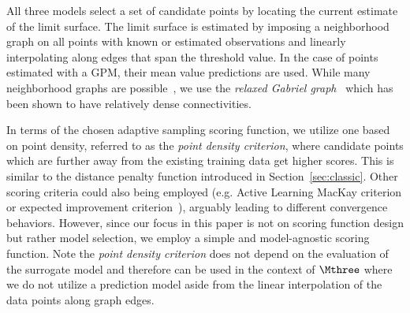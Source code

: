 All three models select a set of candidate points by locating the current estimate of the limit surface.
%
The limit surface is estimated by imposing a neighborhood graph on all points with known or estimated observations and linearly interpolating along edges that span the threshold value.
%
In the case of points estimated with a GPM, their mean value predictions are used.
%
While many neighborhood graphs are possible~\cite{CorreaLindstrom2011,MaljovecSahaLindstrom2013}, we use the \emph{relaxed Gabriel graph}~\cite{BoseCardinalCollette2009} which has been shown to have relatively dense connectivities.

In terms of the chosen adaptive sampling scoring function, we utilize one based on point density, referred to as the \emph{point density criterion}, where candidate points which are further away from the existing training data get higher scores.
%
This is similar to the distance penalty function introduced in Section~\ref{sec:classic}.
%
Other scoring criteria could also being employed (e.g. Active Learning MacKay criterion \cite{MacKay1992} or expected improvement criterion~\cite{Lam2008,JonesSchonlauWelch1998,Schonlau1997}), arguably leading to different convergence behaviors.
%
However, since our focus in this paper is not on scoring function design but rather model selection, we employ a simple and model-agnostic scoring function.
%
Note the \emph{point density criterion} does not depend on the evaluation of the surrogate model and therefore can be used in the context of $\Mthree$ where we do not utilize a prediction model aside from the linear interpolation of the data points along graph edges.

